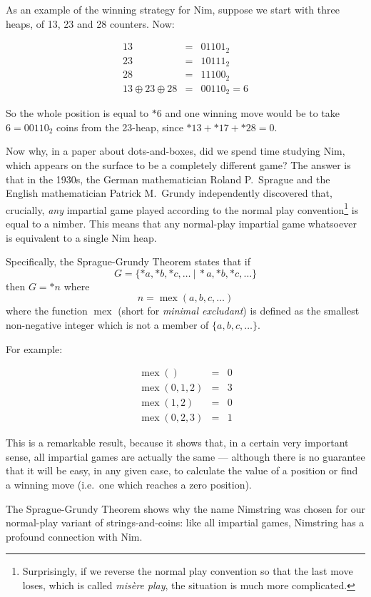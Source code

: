 \documentclass[a4paper,twocolumn]{article}
\DeclareMathOperator{\mex}{mex}
\newcommand{\cgtgame}[2]{\{#1 \:|\: #2\}}
\begin{document}
As an example of the winning strategy for Nim, suppose we start with
three heaps, of 13, 23 and 28 counters. Now:

\begin{eqnarray*}
  13 & = & 01101_2 \\
  23 & = & 10111_2 \\
  28 & = & 11100_2 \\
  13 \oplus 23 \oplus 28 & = & 00110_2 = 6
\end{eqnarray*}

So the whole position is equal to $*6$ and one winning move would be
to take $6 = 00110_2$ coins from the 23-heap, since $*13 + *17 + *28 =
0$.

Now why, in a paper about dots-and-boxes, did we spend time studying
Nim, which appears on the surface to be a completely different game?
The answer is that in the 1930s, the German mathematician Roland
P.\ Sprague and the English mathematician Patrick M.\ Grundy
independently discovered that, crucially, \emph{any} impartial game
played according to the normal play convention\footnote{Surprisingly,
  if we reverse the normal play convention so that the last move
  loses, which is called \emph{mis\`ere play}, the situation is much
  more complicated.} is equal to a nimber. This means that any
normal-play impartial game whatsoever is equivalent to a single Nim
heap.

Specifically, the Sprague-Grundy Theorem states that if $$G =
\cgtgame{*a, *b, *c, \ldots}{*a, *b, *c, \ldots}$$ then $G = *n$
where $$n = \mex(a, b, c, \ldots)$$ where the function $\mex$ (short
for \emph{minimal excludant}) is defined as the smallest non-negative
integer which is not a member of $\{a, b, c, \ldots\}$.

For example:

\begin{eqnarray*}
  \mex() & = & 0 \\
  \mex(0, 1, 2) & = & 3 \\
  \mex(1, 2) & = & 0 \\
  \mex(0, 2, 3) & = & 1
\end{eqnarray*}

This is a remarkable result, because it shows that, in a certain very
important sense, all impartial games are actually the same ---
although there is no guarantee that it will be easy, in any given
case, to calculate the value of a position or find a winning move
(i.e.\ one which reaches a zero position).

The Sprague-Grundy Theorem shows why the name Nimstring was chosen for
our normal-play variant of strings-and-coins: like all impartial
games, Nimstring has a profound connection with Nim.
\end{document}
